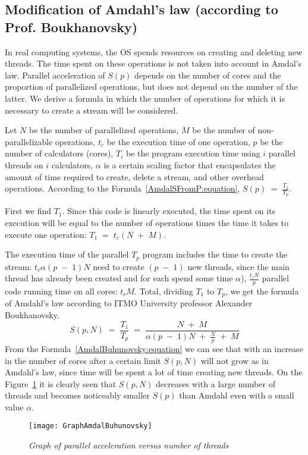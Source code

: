 { %
	\subsection{Modification of Amdahl's law (according to Prof. Boukhanovsky)}
	\par In real computing systems, the OS spends resources on creating and deleting new threads. The time spent on these operations is not taken into account in Amdal's law. Parallel acceleration of $ S (p) $ depends on the number of cores and the proportion of parallelized operations, but does not depend on the number of the latter. We derive a formula in which the number of operations for which it is necessary to create a stream will be considered.
	\par Let $N$ be the number of parallelized operations, $ M $ be the number of non-parallelizable operations,  $t_c$ be the execution time of one operation, $p$ be the number of calculators (cores), $T_i$ be the program execution time using $i$ parallel threads on $i$ calculators, $\alpha$ is a certain scaling factor that encapsulates the amount of time required to create, delete a stream, and other overhead operations.
According to the Formula~\eqref{AmdalSFromP:equation}, $S(p)\;=\;\frac{T_1}{T_p}$.
	\par First we find $ T_1 $. Since this code is linearly executed, the time spent on its execution will be equal to the number of operations times the time it takes to execute one operation: $T_1\;=\;t_c(N\;+\;M)$. 
	\par The execution time of the parallel $T_p$ program includes the time to create the stream: $t_c\alpha(p\;-\;1)N$ need to create $(p\;-\;1)$ new threads, since the main thread has already been created and for each spend some time $\alpha$),  $\frac {t_cN}p$ parallel code running time on all cores: $t_cM$. Total, dividing $T_1$ to $T_p$, we get the formula of Amdahl’s law according to ITMO University professor Alexander Boukhanovsky.
	\begin{equation}
		\label{AmdalBuhunovsky:equation}
		S(p,N)\;=\;\frac{T_1}{T_p}\;=\;\frac{N\;+\;M}{\alpha(p\;-\;1)N\;+\;\frac Np\;+\;M}
	\end{equation}
From the Formula~\eqref{AmdalBuhunovsky:equation} we can see that with an increase in the number of cores after a certain limit $S(p,N)$ will not grow as in Amdahl’s law, since time will be spent a lot of time creating new threads. On the Figure~\ref{GraphAmdalBuhunovsky:image} it is clearly seen that $S(p,N)$ decreases with a large number of threads and becomes noticeably smaller $S(p)$ than Amdahl even with a small value $\alpha$.
	\begin{figure}[H]
		\texttt{[image: GraphAmdalBuhunovsky]}
		\caption{\textit{Graph of parallel acceleration versus number of threads}}
		\label{GraphAmdalBuhunovsky:image}
	\end{figure}
}